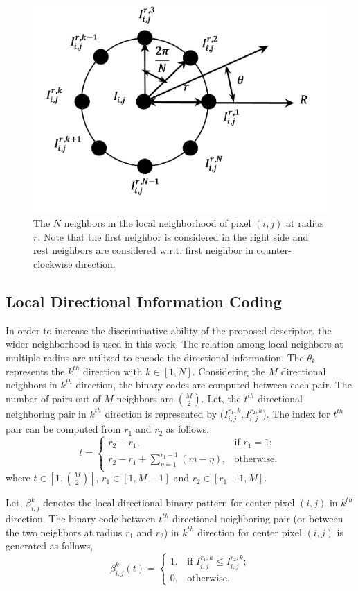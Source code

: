 \documentclass[a4paper]{article}
\begin{document}
\begin{figure}[!t]
    \centering
    \includegraphics[width=.8\linewidth]{1.png}
    \caption{The $N$ neighbors in the local neighborhood of pixel $(i,j)$ at radius $r$. Note that the first neighbor is considered in the right side and rest neighbors are considered w.r.t. first neighbor in counter-clockwise direction.}
    \label{fig:neighbors}
\end{figure}



\subsection{Local Directional Information Coding}
In order to increase the discriminative ability of the proposed descriptor, the wider neighborhood is used in this work. The relation among local neighbors at multiple radius are utilized to encode the directional information. The $\theta_k$ represents the $k^{th}$ direction with $k\in[1,N]$. Considering the $M$ directional neighbors in $k^{th}$ direction, the binary codes are computed between each pair. The number of pairs out of $M$ neighbors are $\binom{M}{2}$. Let, the $t^{th}$ directional neighboring pair in $k^{th}$ direction is represented by ($I_{i,j}^{r_1,k}, I_{i,j}^{r_2,k}$). The index for $t^{th}$ pair can be computed from $r_1$ and $r_2$ as follows,
\begin{equation}
t = 
\begin{cases}
r_2-r_1, &\text{if $r_1=1$;}\\
r_2-r_1+\sum_{\eta=1}^{r_1-1}(m-\eta), &\text{otherwise.}
\end{cases}
\end{equation}
where $t\in[1,\binom{M}{2}]$, $r_1\in[1,M-1]$ and $r_2\in[r_1+1,M]$.

Let, $\beta_{i,j}^{k}$ denotes the local directional binary pattern for center pixel $(i,j)$ in $k^{th}$ direction. The binary code between $t^{th}$ directional neighboring pair (or between the two neighbors at radius $r_1$ and $r_2$) in $k^{th}$ direction for center pixel $(i,j)$ is generated as follows,
\begin{equation}
\beta_{i,j}^{k}(t) = 
\begin{cases}
1, &\text{if $I_{i,j}^{r_1,k} \leq I_{i,j}^{r_2,k}$;}\\
0, &\text{otherwise.}
\end{cases}
\end{equation}
\end{document}
